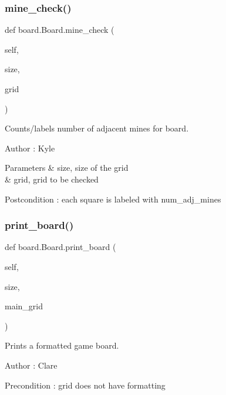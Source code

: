 \subsubsection{\texorpdfstring{mine\+\_\+check()}{mine\_check()}}
{\footnotesize\ttfamily def board.\+Board.\+mine\+\_\+check (\begin{DoxyParamCaption}\item[{}]{self,  }\item[{}]{size,  }\item[{}]{grid }\end{DoxyParamCaption})}



Counts/labels number of adjacent mines for board. 

\begin{DoxyAuthor}{Author}
\+: Kyle 
\end{DoxyAuthor}

\begin{DoxyParams}{Parameters}
{\em } & size, size of the grid \\
\hline
{\em } & grid, grid to be checked \\
\hline
\end{DoxyParams}
\begin{DoxyPostcond}{Postcondition}
\+: each square is labeled with num\+\_\+adj\+\_\+mines 
\end{DoxyPostcond}
\mbox{\label{classboard_1_1_board_a8bdf74538bc47d64bd0c029b6fc5b653}} 
\subsubsection{\texorpdfstring{print\+\_\+board()}{print\_board()}}
{\footnotesize\ttfamily def board.\+Board.\+print\+\_\+board (\begin{DoxyParamCaption}\item[{}]{self,  }\item[{}]{size,  }\item[{}]{main\+\_\+grid }\end{DoxyParamCaption})}



Prints a formatted game board. 

\begin{DoxyAuthor}{Author}
\+: Clare 
\end{DoxyAuthor}
\begin{DoxyPrecond}{Precondition}
\+: grid does not have formatting 
\end{DoxyPrecond}

